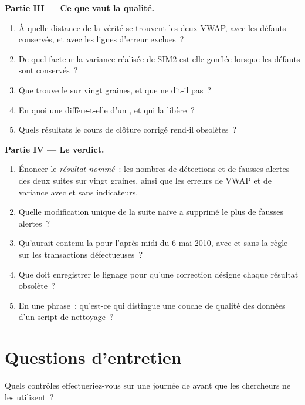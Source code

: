 \begin{problem}
\medskip\noindent\textbf{Partie III --- Ce que vaut la qualité.}
\begin{enumerate}[resume]
\item À quelle distance de la vérité se trouvent les deux VWAP, avec les défauts conservés, et avec les lignes d'erreur exclues~?
\item De quel facteur la variance réalisée de SIM2 est-elle gonflée lorsque les défauts sont conservés~?
\item Que trouve le  sur vingt graines, et que ne dit-il pas~?
\item En quoi une  diffère-t-elle d'un , et qui la libère~?
\item Quels résultats le cours de clôture corrigé rend-il obsolètes~?
\end{enumerate}

\medskip\noindent\textbf{Partie IV --- Le verdict.}
\begin{enumerate}[resume]
\item Énoncer le \emph{résultat nommé}~: les nombres de détections et de fausses alertes des deux suites sur vingt graines, ainsi que les erreurs de VWAP et de variance
avec et sans indicateurs.
\item Quelle modification unique de la suite naïve a supprimé le plus de fausses alertes~?
\item Qu'aurait contenu la  pour l'après-midi du 6 mai 2010, avec et sans la règle sur les transactions défectueuses~?
\item Que doit enregistrer le lignage pour qu'une correction désigne chaque résultat obsolète~?
\item En une phrase~: qu'est-ce qui distingue une couche de qualité des données d'un script de nettoyage~?
\end{enumerate}
\end{problem}

\section{Questions d'entretien}

\begin{interviewq}\label{iq:pl:data-quality-and-lineage:1}
Quels contrôles effectueriez-vous sur une journée de  avant que les chercheurs ne les utilisent~?
\end{interviewq}


